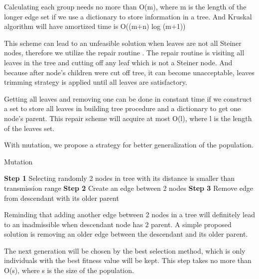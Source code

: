 Calculating each group needs no more than O(m), where m is the length of the longer edge set if we use a dictionary to store information in a tree. And Kruskal algorithm will have amortized time is O((m+n) log (m+1))

This scheme can lead to an unfeasible solution when leaves are not all Steiner nodes, therefore we utilize the repair routine \cite{lu2014construction}. The repair routine is visiting all leaves in the tree and cutting off any leaf which is not a Steiner node. And because after node’s children were cut off tree, it can become unacceptable, leaves trimming strategy is applied until all leaves are satisfactory.

Getting all leaves and removing one can be done in constant time if we construct a set to store all leaves in building tree procedure and a dictionary to get one node’s parent. This repair scheme will acquire at most O(l), where l is the length of the leaves set.

With mutation, we propose a strategy for better generalization of the population.

\begin{algorithm}
\caption{Mutation}
\begin{algorithmic}[0]
\State \textbf{Step 1} Selecting randomly 2 nodes in tree with its distance is smaller than transmission range
\State \textbf{Step 2} Create an edge between 2 nodes
\State \textbf{Step 3} Remove edge from descendant with its older parent
\end{algorithmic}
\end{algorithm}

Reminding that adding another edge between 2 nodes in a tree will definitely lead to an inadmissible when descendant node has 2 parent. A simple proposed solution is removing an older edge between the descendant and its older parent.

\noindent{} 

The next generation will be chosen by the best selection method, which is only individuals with the best fitness value will be kept. This step takes no more than O(s), where s is the size of the population.